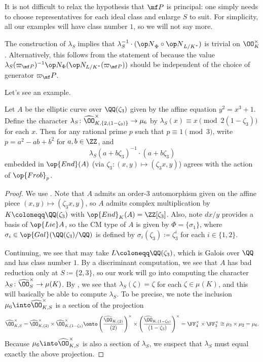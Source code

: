 \documentclass[../thesis.tex]{subfiles}
\begin{document}
\begin{remark}
	It is not difficult to relax the hypothesis that $\mf P$ is principal: one simply needs to choose representatives for each ideal class and enlarge $S$ to suit. For simplicity, all our examples will have class number $1$, so we will not say more.
\end{remark}
\begin{remark} \label{rem:lambda-on-units}
	The construction of $\lambda_S$ implies that $\lambda_S^{-1}\cdot({\op N}_\Phi\circ{\op N}_{L/K^*})$ is trivial on $\OO_K^\times$. Alternatively, this follows from the statement of  because the value $\lambda_S(\varpi_{\mf P})^{-1}\op N_\Phi(\op N_{L/K^*}(\varpi_{\mf P}))$ should be independent of the choice of generator $\varpi_\mf P$.
\end{remark}
Let's see an example.
\begin{example} \label{ex:compute-cm-ec}
	Let $A$ be the elliptic curve over $\QQ(\zeta_3)$ given by the affine equation $y^2=x^3+1$. Define the character $\lambda_S\colon\widehat\OO_{K,\{2,(1-\zeta_3)\}}^\times\to\mu_6$ by $\lambda_S(x)\equiv x\pmod{2(1-\zeta_3)}$ for each $x$. Then for any rational prime $p$ such that $p\equiv1\pmod3$, write $p=a^2-ab+b^2$ for $a,b\in\ZZ$, and
	\[\lambda_S(a+b\zeta_3)^{-1}\cdot(a+b\zeta_3)\]
	embedded in $\op{End}(A)$ (via $\zeta_3\colon(x,y)\mapsto(\zeta_3x,y)$) agrees with the action of $\op{Frob}_p$.
\end{example}
\begin{proof}
	We use . Note that $A$ admits an order-$3$ automorphism given on the affine piece $(x,y)\mapsto(\zeta_3x,y)$, so $A$ admits complex multiplication by $K\coloneqq\QQ(\zeta_3)$ with $\op{End}_K(A)=\ZZ[\zeta_3]$. Also, note $dx/y$ provides a basis of $\op{Lie}A$, so the CM type of $A$ is given by $\Phi=\{\sigma_1\}$, where $\sigma_i\in\op{Gal}(\QQ(\zeta_3)/\QQ)$ is defined by $\sigma_i(\zeta_3)\coloneqq\zeta_3^i$ for each $i\in\{1,2\}$.
	
	Continuing, we see that may take $L\coloneqq\QQ(\zeta_3)$, which is Galois over $\QQ$ and has class number $1$. By a discriminant computation, we see that $A$ has bad reduction only at $S\coloneqq\{2,3\}$, so our work will go into computing the character $\lambda_S\colon\widehat\OO_S^\times\to\mu(K)$. By , we see that $\lambda_S(\zeta)=\zeta$ for each $\zeta\in\mu(K)$, and this will basically be able to compute $\lambda_S$. To be precise, we note the inclusion $\mu_6\into\widehat\OO_{K,S}^\times$ is a section of the projection
	\[\widehat\OO_{K,S}^\times=\widehat\OO_{K,(2)}^\times\times\widehat\OO_{K,(1-\zeta_3)}^\times\onto\left(\frac{\widehat\OO_{K,(2)}}{(2)}\right)^\times\times\left(\frac{\widehat\OO_{K,(1-\zeta_3)}}{(1-\zeta_3)}\right)^\times=\FF_4^\times\times\FF_3^\times\cong\mu_3\times\mu_2=\mu_6.\]
	Because $\mu_6\into\widehat\OO_{K,S}^\times$ is also a section of $\lambda_S$, we suspect that $\lambda_S$ must equal exactly the above projection.\todo{}
\end{proof}
\end{document}
